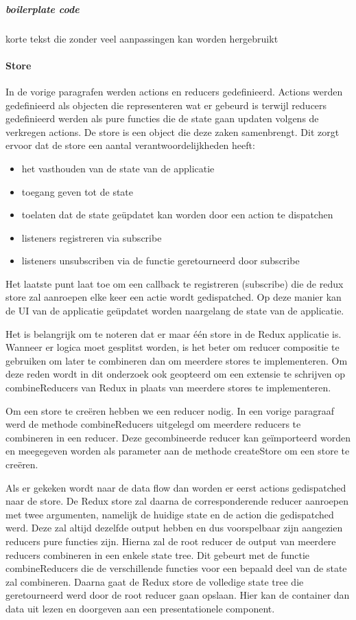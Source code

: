 \subparagraph{boilerplate code}
korte tekst die zonder veel aanpassingen kan worden hergebruikt

\paragraph{Store}
In de vorige paragrafen werden actions en reducers gedefinieerd. Actions werden gedefinieerd als objecten die representeren wat er gebeurd is terwijl reducers gedefinieerd werden als pure functies die de state gaan updaten volgens de verkregen actions. De store is een object die deze zaken samenbrengt. Dit zorgt ervoor dat de store een aantal verantwoordelijkheden heeft:

\begin{itemize}
	\item het vasthouden van de state van de applicatie
	\item toegang geven tot de state
	\item toelaten dat de state geüpdatet kan worden door een action te dispatchen
	\item listeners registreren via subscribe
	\item listeners unsubscriben via de functie geretourneerd door subscribe
\end{itemize}

Het laatste punt laat toe om een callback te registreren (subscribe) die de redux store zal aanroepen elke keer een actie wordt gedispatched. Op deze manier kan de UI van de applicatie geüpdatet worden naargelang de state van de applicatie. 

Het is belangrijk om te noteren dat er maar één store in de Redux applicatie is. Wanneer er logica moet gesplitst worden, is het beter om reducer compositie te gebruiken om later te combineren dan om meerdere stores te implementeren. Om deze reden wordt in dit onderzoek ook geopteerd om een extensie te schrijven op combineReducers van Redux in plaats van meerdere stores te implementeren.

Om een store te creëren hebben we een reducer nodig. In een vorige paragraaf werd de methode combineReducers uitgelegd om meerdere reducers te combineren in een reducer. Deze gecombineerde reducer kan geïmporteerd worden en meegegeven worden als parameter aan de methode createStore om een store te creëren.

Als er gekeken wordt naar de data flow dan worden er eerst actions gedispatched naar de store. De Redux store zal daarna de corresponderende reducer aanroepen met twee argumenten, namelijk de huidige state en de action die gedispatched werd. Deze zal altijd dezelfde output hebben en dus voorspelbaar zijn aangezien reducers pure functies zijn. Hierna zal de root reducer de output van meerdere reducers combineren in een enkele state tree. Dit gebeurt met de functie combineReducers die de verschillende functies voor een bepaald deel van de state zal combineren. Daarna gaat de Redux store de volledige state tree die geretourneerd werd door de root reducer gaan opslaan. Hier kan de container dan data uit lezen en doorgeven aan een presentationele component.
\autocite{Redux02}

